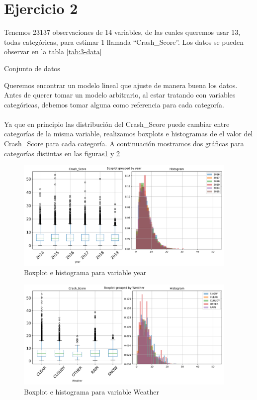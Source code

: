 \documentclass[11pt]{article}
\begin{document}
\section{Ejercicio 2}
Tenemos 23137 observaciones de 14 variables, de las cuales queremos usar 13, todas categóricas, para estimar 1 llamada ``Crash\_Score''. Los datos se pueden observar en la tabla \ref{tab:3-data}
\begin{table}[H]
    \centering
    
    \caption{Conjunto de datos}
    \label{tab:3-data}
\end{table}
Queremos encontrar un modelo lineal que ajuste de manera buena los datos. Antes de querer tomar un modelo arbitrario, al estar tratando con variables categóricas, debemos tomar alguna como referencia para cada categoría. 
\\
\\Ya que en principio las distribución del Crash\_Score puede cambiar entre categorías de la misma variable, realizamos boxplots e histogramas de el valor del Crash\_Score para cada categoría. A continuación mostramos dos gráficas para categorías distintas en las figuras\ref{fig:3-yearHist} y \ref{fig:3-WeatherHist}
\begin{figure}[H]
    \centering
    \includegraphics[width = 0.95\textwidth]{3-yearHist.pdf}
    \caption{Boxplot e histograma para variable year}
    \label{fig:3-yearHist}
\end{figure}
\begin{figure}[H]
    \centering
    \includegraphics[width = 0.95\textwidth]{3-WeatherHist.pdf}
    \caption{Boxplot e histograma para variable Weather}
    \label{fig:3-WeatherHist}
\end{figure}
\end{document}
